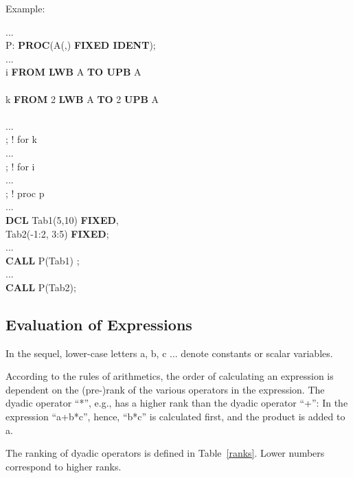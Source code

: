 \newpage
Example:

...\\
P: {\bf PROC}(A(,) {\bf FIXED IDENT});\\
\x ... \\
 i {\bf FROM LWB} A {\bf TO UPB} A\\
\x {} \\
\x \x {} k {\bf FROM} 2 {\bf LWB} A {\bf TO} 2 {\bf UPB} A \\
\x \x \x {} \\
\x \x \x \x \x ...\\
\x \x \x {}; ! for k\\
\x \x ... \\
\x {}; ! for i\\
\x ...\\
; ! proc p \\
...\\
{\bf DCL} Tab1(5,10) {\bf FIXED},\\
\x Tab2(-1:2, 3:5) {\bf FIXED};\\
... \\
{\bf CALL} P(Tab1) ;\\
...\\
{\bf CALL} P(Tab2);

\subsection{Evaluation of Expressions}   %

In the sequel, lower-case letters a, b, c ... denote constants or scalar
variables.

According to the rules of arithmetics, the order of calculating an
expression is dependent on the \mbox{(pre-)}rank of the various operators in
the expression. The dyadic operator ``*'', e.g., has a higher rank than
the dyadic operator ``+'': In the expression ``a+b*c'', hence, ``b*c''
is calculated first, and the product is added to a.

The ranking of dyadic operators is defined in Table~\ref{ranks}. Lower
numbers correspond to higher ranks.

